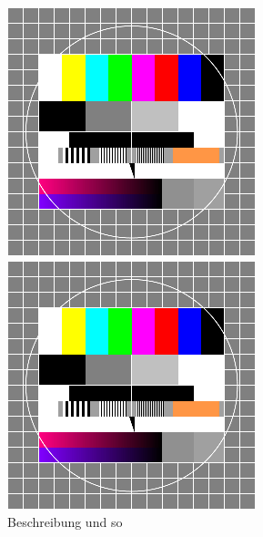 \documentclass[
12pt, %
toc=listofnumbered, %
toc=chapterentrydotfill, %
numbers=noenddot, %
captions=tableheading, %
]{scrreprt}
\begin{document}
\begin{figure}
	\centering
	\begin{minipage}[b]{.4\linewidth} %
		\includegraphics[width=\linewidth]{./images/0_testbild.png}
		\caption{Beschreibung und so}
		\label{fig:testbild_klein_links}
	\end{minipage}
	\hspace{.1\linewidth}%
	\begin{minipage}[b]{.4\linewidth} %
		\includegraphics[width=\linewidth]{./images/0_testbild.png}

\end{minipage}
\end{figure}
\end{document}
